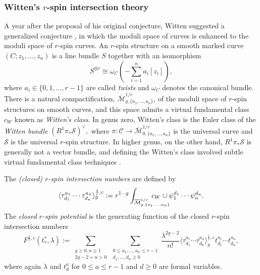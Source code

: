 \documentclass[11pt]{amsart}
\theoremstyle{definition}
\theoremstyle{remark}
\newcommand{\M}{\ensuremath{\overline{\mathcal{M}}}}
\newcommand{\<}{\left<}
\renewcommand{\>}{\right>}
\numberwithin{equation}{section}
\def\Mbar{{\overline{\mathcal M}}}
\begin{document}
\subsubsection{Witten's $r$-spin intersection theory}
A year after the proposal of his original conjecture, Witten suggested a generalized conjecture \cite{Witten93}, in which the moduli space of curves is enhanced to the moduli space of $r$-spin curves.  An $r$-spin structure on a smooth marked curve $(C;z_1, \ldots, z_n)$ is a line bundle $S$ together with an isomorphism
\[S^{\otimes r} \cong \omega_{C}\left(-\sum_{i=1}^n a_i[z_i]\right),\]
where $a_i \in \{0,1,\ldots, r-1\}$ are called \emph{twists} and $\omega_C$ denotes the canonical bundle.  There is a %
natural compactification, $\Mbar_{g,\{a_1, \ldots, a_n\}}^{1/r}$, of %
the moduli space of $r$-spin structures on smooth curves, and this space admits a virtual fundamental class $c_W$ known as \emph{Witten's class}. In genus zero, Witten's class is the Euler class of the \emph{Witten bundle} $(R^1\pi_*\mathcal{S})^{\vee},$ where $\pi: \mathcal{C} \rightarrow \Mbar_{0,\{a_1, \ldots, a_n\}}^{1/r}$ is the %
universal curve and $\mathcal{S}$ %
is the universal $r$-spin structure.  In higher genus, on the other hand, $R^1\pi_*\mathcal{S}$ is generally not a vector bundle, and defining the Witten's class involved subtle virtual fundamental class %
techniques \cite{PV,ChiodoWitten,Moc06,FJR,CLL}.

The %
{\it (closed) $r$-spin intersection numbers} are defined by
\begin{gather}\label{eq:closed r-spin}
\langle\tau^{a_1}_{d_1}\cdots\tau^{a_n}_{d_n}\rangle^{\frac{1}{r},c}_g:=r^{1-g}\int_{\M^{1/r}_{g,\{a_1, \ldots, a_n\}}} \hspace{-1cm} c_W \cup \psi_1^{d_1} \cdots \psi_n^{d_n}.
\end{gather}
The \emph{closed $r$-spin potential}
is the generating function of the closed $r$-spin intersection numbers\[
F^{\frac{1}{r},c}(t^*_*,\lambda):=\sum_{\substack{g \geq 0, n \geq 1\\2g-2+n>0}} \sum_{\substack{0 \leq a_1, \ldots, a_n \leq r-1\\ d_1, \ldots, d_n \geq 0}} \frac{\lambda^{2g-2}}{n!}\langle\tau^{a_1}_{d_1}\cdots\tau^{a_n}_{d_n}\rangle^{\frac{1}{r},c}_g t^{a_1}_{d_1} \cdots t^{a_n}_{d_n},
\]
where again $\lambda$ and $t^a_d$  for $0\le a\le r-1$ and $d\ge 0$ are formal variables. 
\end{document}

